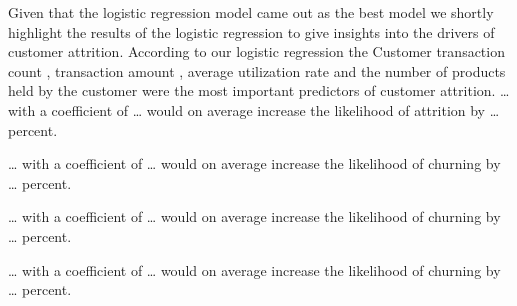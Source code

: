 \documentclass[
]{article}
\begin{document}
Given that the logistic regression model came out as the best model we
shortly highlight the results of the logistic regression to give
insights into the drivers of customer attrition. According to our
logistic regression the Customer transaction count , transaction amount
, average utilization rate and the number of products held by the
customer were the most important predictors of customer attrition.
\ldots{} with a coefficient of \ldots{} would on average increase the
likelihood of attrition by \ldots{} percent.

\ldots{} with a coefficient of \ldots{} would on average increase the
likelihood of churning by \ldots{} percent.

\ldots{} with a coefficient of \ldots{} would on average increase the
likelihood of churning by \ldots{} percent.

\ldots{} with a coefficient of \ldots{} would on average increase the
likelihood of churning by \ldots{} percent.
\end{document}
